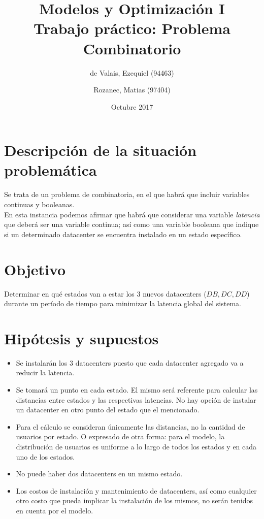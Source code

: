 \documentclass{article}
\begin{document}
\title{Modelos y Optimizaci\'on I\\ \large{Trabajo pr\'actico: Problema Combinatorio}}
\author{de Valais, Ezequiel (94463)\and	Rozanec, Matias (97404)}
\date{Octubre 2017}
\maketitle
\newpage

\tableofcontents
\newpage


\newpage


\part{Descripci\'on de la situaci\'on problem\'atica}
Se trata de un problema de combinatoria, en el que habr\'a que incluir variables continuas y booleanas. \\
En esta instancia podemos afirmar que habr\'a que considerar una variable \textit{latencia} que deber\'a ser una variable continua; as\'i como una variable booleana que indique si un determinado datacenter se encuentra instalado en un estado espec\'ifico.

\part{Objetivo}
Determinar en qu\'e estados van a estar los 3 nuevos datacenters ($DB, DC, DD$) durante un per\'iodo de tiempo para minimizar la latencia global del sistema.

\part{Hip\'otesis y supuestos}
\begin{itemize}
	\item Se instalar\'an los 3 datacenters puesto que cada datacenter agregado va a reducir la latencia.
	\item Se tomar\'a un punto en cada estado. El mismo ser\'a referente para calcular las distancias entre estados y las respectivas latencias. No hay opci\'on de instalar un datacenter en otro punto del estado que el mencionado.
	\item Para el c\'alculo se consideran \'unicamente las distancias, no la cantidad de usuarios por estado. O expresado de otra forma: para el modelo, la distribuci\'on de usuarios es uniforme a lo largo de todos los estados y en cada uno de los estados. 
	\item No puede haber dos datacenters en un mismo estado.
	\item Los costos de instalaci\'on y mantenimiento de datacenters, as\'i como cualquier otro costo que pueda implicar la instalaci\'on de los mismos, no ser\'an tenidos en cuenta por el modelo.
\end{itemize}
\newpage
\end{document}
